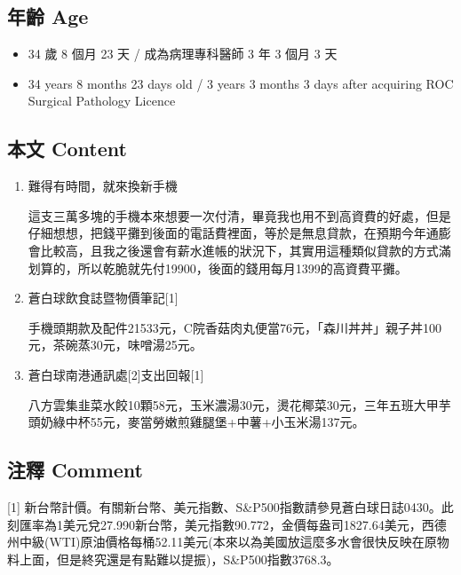 \documentclass[
]{article}
\providecommand{\tightlist}{%
  \setlength{\itemsep}{0pt}\setlength{\parskip}{0pt}}
\begin{document}
\hypertarget{ux5e74ux9f61-age-14}{%
\subsection{年齡 Age}\label{ux5e74ux9f61-age-14}}

\begin{itemize}
\tightlist
\item
  34 歲 8 個月 23 天 / 成為病理專科醫師 3 年 3 個月 3 天
\item
  34 years 8 months 23 days old / 3 years 3 months 3 days after
  acquiring ROC Surgical Pathology Licence
\end{itemize}

\hypertarget{ux672cux6587-content-14}{%
\subsection{本文 Content}\label{ux672cux6587-content-14}}

\begin{enumerate}
\def\labelenumi{\arabic{enumi}.}
\item
  難得有時間，就來換新手機

  這支三萬多塊的手機本來想要一次付清，畢竟我也用不到高資費的好處，但是仔細想想，把錢平攤到後面的電話費裡面，等於是無息貸款，在預期今年通膨會比較高，且我之後還會有薪水進帳的狀況下，其實用這種類似貸款的方式滿划算的，所以乾脆就先付19900，後面的錢用每月1399的高資費平攤。
\item
  蒼白球飲食誌暨物價筆記{[}1{]}

  手機頭期款及配件21533元，C院香菇肉丸便當76元，「森川丼丼」親子丼100元，茶碗蒸30元，味噌湯25元。
\item
  蒼白球南港通訊處{[}2{]}支出回報{[}1{]}

  八方雲集韭菜水餃10顆58元，玉米濃湯30元，燙花椰菜30元，三年五班大甲芋頭奶綠中杯55元，麥當勞嫩煎雞腿堡+中薯+小玉米湯137元。
\end{enumerate}

\hypertarget{ux6ce8ux91cb-comment-14}{%
\subsection{注釋 Comment}\label{ux6ce8ux91cb-comment-14}}

{[}1{]}
新台幣計價。有關新台幣、美元指數、S\&P500指數請參見蒼白球日誌0430。此刻匯率為1美元兌27.990新台幣，美元指數90.772，金價每盎司1827.64美元，西德州中級(WTI)原油價格每桶52.11美元(本來以為美國放這麼多水會很快反映在原物料上面，但是終究還是有點難以提振)，S\&P500指數3768.3。
\end{document}
